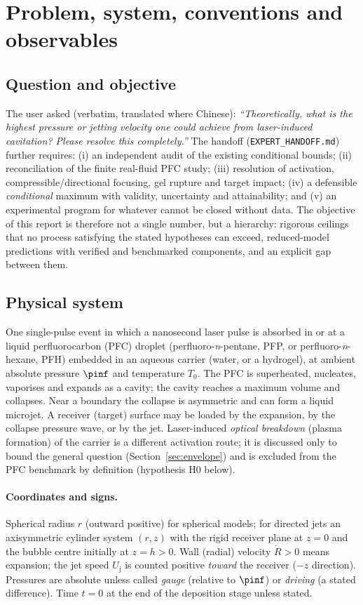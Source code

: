 \section{Problem, system, conventions and observables}\label{sec:setup}

\subsection{Question and objective}
The user asked (verbatim, translated where Chinese): \emph{``Theoretically, what is the highest
pressure or jetting velocity one could achieve from laser-induced cavitation? Please resolve this
completely.''} The handoff (\texttt{EXPERT\_HANDOFF.md}) further requires: (i) an independent audit of the
existing conditional bounds; (ii) reconciliation of the finite real-fluid PFC study; (iii) resolution of
activation, compressible/directional focusing, gel rupture and target impact; (iv) a defensible
\emph{conditional} maximum with validity, uncertainty and attainability; and (v) an experimental program
for whatever cannot be closed without data. The objective of this report is therefore not a single
number, but a hierarchy: rigorous ceilings that no process satisfying the stated hypotheses can
exceed, reduced-model predictions with verified and benchmarked components, and an explicit gap between them.

\subsection{Physical system}
One single-pulse event in which a nanosecond laser pulse is absorbed in or at a liquid
perfluorocarbon (PFC) droplet (perfluoro-\emph{n}-pentane, PFP, or perfluoro-\emph{n}-hexane, PFH)
embedded in an aqueous carrier (water, or a hydrogel), at ambient absolute pressure $\pinf$ and
temperature $T_0$. The PFC is superheated, nucleates, vaporises and expands as a cavity; the cavity
reaches a maximum volume and collapses. Near a boundary the collapse is asymmetric and can form a
liquid microjet. A receiver (target) surface may be loaded by the expansion, by the collapse pressure
wave, or by the jet. Laser-induced \emph{optical breakdown} (plasma formation) of the carrier is a
different activation route; it is discussed only to bound the general question (Section~\ref{sec:envelope})
and is excluded from the PFC benchmark by definition (hypothesis H0 below).

\paragraph{Coordinates and signs.} Spherical radius $r$ (outward positive) for spherical models;
for directed jets an axisymmetric cylinder system $(r,z)$ with the rigid receiver plane at $z=0$ and the
bubble centre initially at $z=h>0$. Wall (radial) velocity $\dot R>0$ means expansion; the jet speed
$U_{\mathrm j}$ is counted positive \emph{toward} the receiver ($-z$ direction). Pressures are
absolute unless called \emph{gauge} (relative to $\pinf$) or \emph{driving} (a stated difference). Time
$t=0$ at the end of the deposition stage unless stated.


